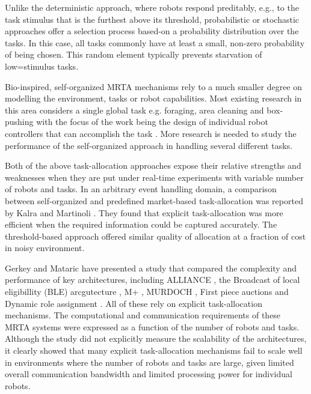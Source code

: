 \documentclass[journal]{IEEEtran}
\begin{document}
Unlike the deterministic approach, where robots respond preditably, e.g., to the task stimulus that is the furthest above its threshold, probabilistic or stochastic approaches offer a selection process based-on a probability distribution over the tasks.  In this case, all tasks commonly have at least a small, non-zero probability of being chosen.  This random element typically prevents starvation of low=stimulus tasks.

Bio-inspired, self-organized MRTA mechanisms rely to a much smaller degree on modelling the environment, tasks or robot capabilities.  Most existing research in this area considers a single global task e.g. foraging, area cleaning and box-pushing with the focus of the work being the design of individual robot controllers that can accomplish the task \cite{Gerkey+2003}. More research is needed to study the performance of the self-organized approach in handling several different tasks. %

Both of the above task-allocation approaches expose their relative strengths and weaknesses when they are put under real-time experiments with variable number of robots and tasks. In an arbitrary event handling domain, a comparison between self-organized and predefined market-based task-allocation was reported by Kalra and Martinoli \cite{kalra+2007}.  They found that explicit task-allocation was more efficient when the required information could be captured accurately.  The threshold-based approach offered similar quality of allocation at a fraction of cost in noisy environment.  

Gerkey and Mataric have presented a study \cite{Gerkey+2003} that compared the complexity and performance of key architectures, including ALLIANCE \cite{Parker1998}, the Broadcast of local eligibillity (BLE) arcgutecture \cite{Werger2001}, M+ \cite{Botelho+1999}, MURDOCH \cite{Gerkey+2002}, First piece auctions \cite{Zlot+2002} and Dynamic role assignment \cite{Chaimowicz2002}.  All of these rely on explicit task-allocation mechanisms. The computational and communication requirements of these MRTA systems were expressed as a function of the number of robots and tasks.  Although the study did not explicitly measure the scalability of the architectures, it clearly showed that many explicit task-allocation mechanisms fail to scale well in environments where the number of robots and tasks are large, given limited overall communication bandwidth and limited processing power for individual robots.
\end{document}
